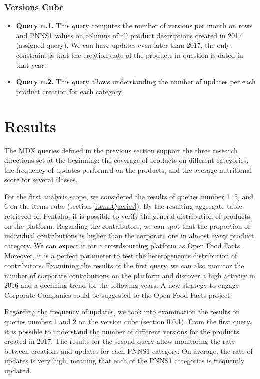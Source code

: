 \documentclass[runningheads]{llncs}
\begin{document}
\subsubsection{Versions Cube}\label{versionsQueries}
\begin{itemize}
    \item \textbf{Query n.1.} This query computes the number of versions per month on rows and PNNS1 values on columns of all product descriptions created in 2017 (assigned query). We can have updates even later than 2017, the only constraint is that the creation date of the products in question is dated in that year.
    \item \textbf{Query n.2.} This query allows understanding the number of updates per each product creation for each category.
    
\end{itemize}

\section{Results}\label{results}
The MDX queries defined in the previous section support the three research directions set at the beginning: the coverage of products on different categories, the frequency of updates performed on the products, and the average nutritional score for several classes. 

For the first analysis scope, we considered the results of queries number 1, 5, and 6 on the items cube (section \ref{itemsQueries}). By the resulting aggregate table retrieved on Pentaho, it is possible to verify the general distribution of products on the platform. Regarding the contributors, we can spot that the proportion of individual contributions is higher than the corporate one in almost every product category. We can expect it for a crowdsourcing platform as Open Food Facts. Moreover, it is a perfect parameter to test the heterogeneous distribution of contributors. Examining the results of the first query, we can also monitor the number of corporate contributions on the platform and discover a high activity in 2016 and a declining trend for the following years. A new strategy to engage Corporate Companies could be suggested to the Open Food Facts project.

Regarding the frequency of updates, we took into examination the results on queries number 1 and 2 on the version cube (section \ref{versionsQueries}). From the first query, it is possible to understand the number of different versions for the products created in 2017. The results for the second query allow monitoring the rate between creations and updates for each PNNS1 category. On average, the rate of updates is very high, meaning that each of the PNNS1 categories is frequently updated. 
\end{document}
